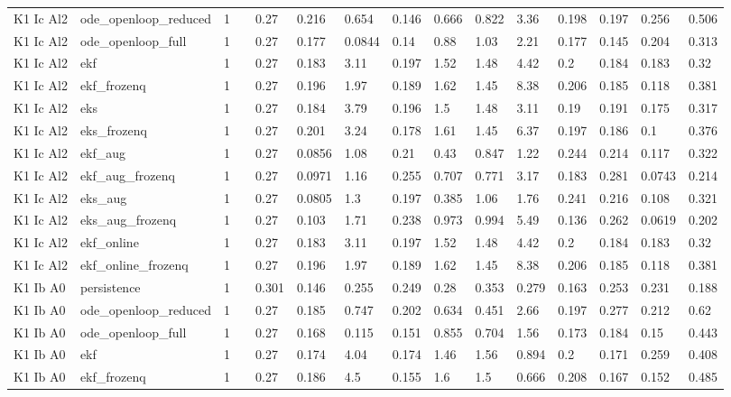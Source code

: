 \begin{table}[t]
\begin{tabular}{lllllllllllllll}
K1 Ic Al2 & ode\_openloop\_reduced & 1 &  & 0.27 & 0.216 & 0.654 & 0.146 & 0.666 & 0.822 & 3.36 & 0.198 & 0.197 & 0.256 & 0.506 \\
K1 Ic Al2 & ode\_openloop\_full & 1 &  & 0.27 & 0.177 & 0.0844 & 0.14 & 0.88 & 1.03 & 2.21 & 0.177 & 0.145 & 0.204 & 0.313 \\
K1 Ic Al2 & ekf & 1 &  & 0.27 & 0.183 & 3.11 & 0.197 & 1.52 & 1.48 & 4.42 & 0.2 & 0.184 & 0.183 & 0.32 \\
K1 Ic Al2 & ekf\_frozenq & 1 &  & 0.27 & 0.196 & 1.97 & 0.189 & 1.62 & 1.45 & 8.38 & 0.206 & 0.185 & 0.118 & 0.381 \\
K1 Ic Al2 & eks & 1 &  & 0.27 & 0.184 & 3.79 & 0.196 & 1.5 & 1.48 & 3.11 & 0.19 & 0.191 & 0.175 & 0.317 \\
K1 Ic Al2 & eks\_frozenq & 1 &  & 0.27 & 0.201 & 3.24 & 0.178 & 1.61 & 1.45 & 6.37 & 0.197 & 0.186 & 0.1 & 0.376 \\
K1 Ic Al2 & ekf\_aug & 1 &  & 0.27 & 0.0856 & 1.08 & 0.21 & 0.43 & 0.847 & 1.22 & 0.244 & 0.214 & 0.117 & 0.322 \\
K1 Ic Al2 & ekf\_aug\_frozenq & 1 &  & 0.27 & 0.0971 & 1.16 & 0.255 & 0.707 & 0.771 & 3.17 & 0.183 & 0.281 & 0.0743 & 0.214 \\
K1 Ic Al2 & eks\_aug & 1 &  & 0.27 & 0.0805 & 1.3 & 0.197 & 0.385 & 1.06 & 1.76 & 0.241 & 0.216 & 0.108 & 0.321 \\
K1 Ic Al2 & eks\_aug\_frozenq & 1 &  & 0.27 & 0.103 & 1.71 & 0.238 & 0.973 & 0.994 & 5.49 & 0.136 & 0.262 & 0.0619 & 0.202 \\
K1 Ic Al2 & ekf\_online & 1 &  & 0.27 & 0.183 & 3.11 & 0.197 & 1.52 & 1.48 & 4.42 & 0.2 & 0.184 & 0.183 & 0.32 \\
K1 Ic Al2 & ekf\_online\_frozenq & 1 &  & 0.27 & 0.196 & 1.97 & 0.189 & 1.62 & 1.45 & 8.38 & 0.206 & 0.185 & 0.118 & 0.381 \\
K1 Ib A0 & persistence & 1 &  & 0.301 & 0.146 & 0.255 & 0.249 & 0.28 & 0.353 & 0.279 & 0.163 & 0.253 & 0.231 & 0.188 \\
K1 Ib A0 & ode\_openloop\_reduced & 1 &  & 0.27 & 0.185 & 0.747 & 0.202 & 0.634 & 0.451 & 2.66 & 0.197 & 0.277 & 0.212 & 0.62 \\
K1 Ib A0 & ode\_openloop\_full & 1 &  & 0.27 & 0.168 & 0.115 & 0.151 & 0.855 & 0.704 & 1.56 & 0.173 & 0.184 & 0.15 & 0.443 \\
K1 Ib A0 & ekf & 1 &  & 0.27 & 0.174 & 4.04 & 0.174 & 1.46 & 1.56 & 0.894 & 0.2 & 0.171 & 0.259 & 0.408 \\
K1 Ib A0 & ekf\_frozenq & 1 &  & 0.27 & 0.186 & 4.5 & 0.155 & 1.6 & 1.5 & 0.666 & 0.208 & 0.167 & 0.152 & 0.485 \\

\end{tabular}
\end{table}
